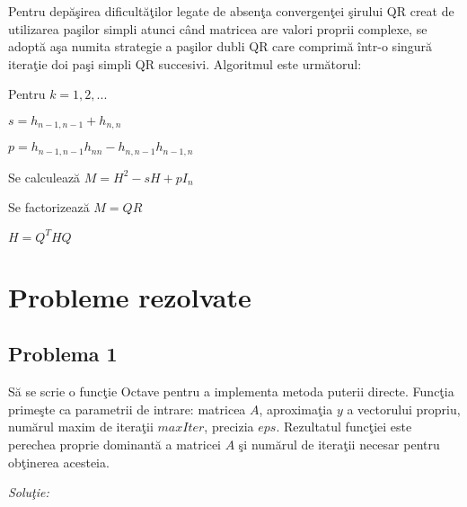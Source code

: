 \documentclass{exam}
\begin{document}
\begin{itemize}
	      Pentru depăşirea dificultăţilor legate de absenţa convergenţei şirului QR creat de utilizarea
	      paşilor simpli atunci când matricea are valori proprii complexe, se adoptă aşa numita strategie a
	      paşilor dubli QR care comprimă într-o singură iteraţie doi paşi simpli QR succesivi. Algoritmul este următorul:

	      \hspace{5 mm} Pentru $k = 1, 2, ... $

	      \hspace{5 mm} \hspace{5 mm} $s = h_{n-1,n-1} + h_{n,n}$

	      \hspace{5 mm} \hspace{5 mm} $p = h_{n-1,n-1} h_{nn} - h_{n,n-1} h_{n-1,n}$

	      \hspace{5 mm} \hspace{5 mm} Se calculează $M = H^{2} - sH + pI_{n}$

	      \hspace{5 mm} \hspace{5 mm} Se factorizează $M = QR$

	      \hspace{5 mm} \hspace{5 mm} $H = Q^{T}HQ$


\end{itemize}

\section{Probleme rezolvate}


\subsection{Problema 1}
Să se scrie o funcţie Octave pentru a implementa metoda puterii directe. Funcţia primeşte ca parametrii de intrare: matricea $A$, aproximaţia $y$ a vectorului propriu, numărul maxim de iteraţii $maxIter$, precizia $eps$. Rezultatul funcţiei este perechea proprie dominantă a matricei $A$ şi numărul de iteraţii necesar pentru obţinerea acesteia.

\textit{Soluţie:}
\end{document}

